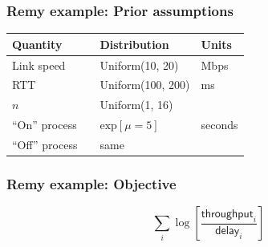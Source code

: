 \documentclass[svgnames]{beamer}
\begin{document}
\begin{frame}
\frametitle{Remy example: Prior assumptions}

\large

\begin{tabular}{llll}
\bf Quantity & & \bf Distribution & \bf Units \\

\hline Link speed & & Uniform(10, 20) & Mbps \\

RTT & & Uniform(100, 200) & ms \\

$n$ & & Uniform(1, 16) \\

``On'' process & & $\mathrm{exp}[\mu = 5]$ & seconds \\

``Off'' process & & same \\

\end{tabular}

\end{frame}

\begin{frame}
\frametitle{Remy example: Objective}

\LARGE

\[\sum_i \log \left[ \frac{\textsf{throughput}_i}{\textsf{delay}_i} \right]\]

\end{frame}


\end{document}
